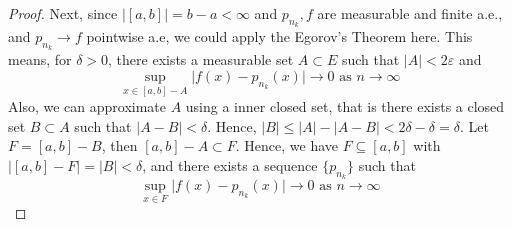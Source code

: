 \begin{answer}
\begin{proof}
        Next, since $\lvert [a,b] \rvert = b-a < \infty$ and $p_{n_k}, f$ are measurable and finite a.e., and $p_{n_k} \to f$ pointwise a.e, we could apply the Egorov's Theorem here. This means, for $\delta > 0$, there exists a measurable set $A \subset E$ such that $\lvert A \rvert < 2\varepsilon$ and
        \begin{equation}
            \sup_{x\in[a,b] - A} \lvert f(x) - p_{n_k}(x) \rvert \to 0 \text{ as } n\to \infty
        \end{equation}
        Also, we can approximate $A$ using a inner closed set, that is there exists a closed set $B \subset A$ such that $\lvert A - B \rvert < \delta$. Hence, $\lvert B \rvert \leq \lvert A \rvert - \lvert A - B \rvert < 2\delta - \delta = \delta$. Let $F = [a,b]-B$, then $[a,b]-A \subset F$. Hence, we have $F \subseteq[a,b]$ with $\lvert [a,b] - F \rvert = \lvert B \rvert < \delta$, and there exists a sequence $\{p_{n_k}\}$ such that
        \begin{equation}
            \sup_{x\in F}\lvert f(x) - p_{n_k}(x) \rvert \to 0 \text{ as } n \to \infty
        \end{equation}
    \end{proof}
\end{answer}